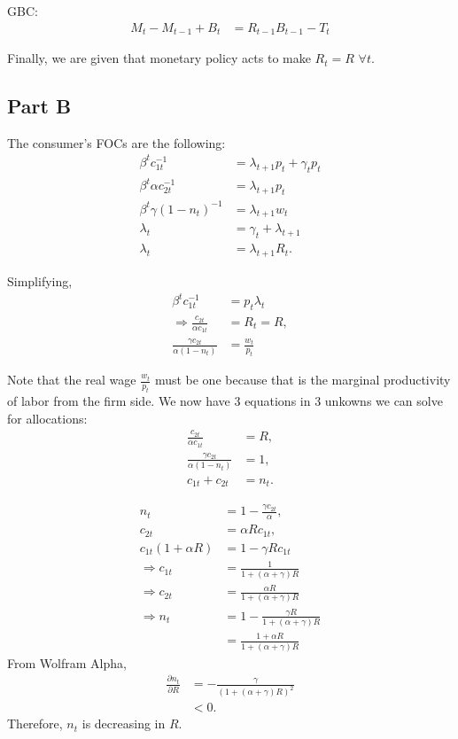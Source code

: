 \documentclass[11pt]{article} %
\begin{document}
GBC:
\begin{align*}
M_t - M_{t-1} + B_t &= R_{t-1}B_{t-1} - T_t
\end{align*}

Finally, we are given that monetary policy acts to make $R_t = R$ $\forall t.$
\subsection{Part B}
The consumer's FOCs are the following:
\begin{align*}
\beta^t c_{1t}^{-1} &= \lambda_{t+1} p_{t} + \gamma_t p_t\\
\beta^t \alpha c_{2t}^{-1} &= \lambda_{t+1}p_{t}\\
\beta^t \gamma (1-n_t)^{-1} &= \lambda_{t+1}w_t\\
\lambda_t &= \gamma_t + \lambda_{t+1} \\
\lambda_{t} &= \lambda_{t+1} R_{t}.
\end{align*}

Simplifying,
\begin{align*}
\beta^t c_{1t}^{-1} &= p_t\lambda_t\\
\Rightarrow \frac{c_{2t}}{\alpha c_{1t}} &= R_t = R, \\
\frac{\gamma c_{2t}}{\alpha(1-n_t)} &= \frac{w_t}{p_t}
\end{align*}

Note that the real wage $\frac{w_t}{p_t}$ must be one because that is the marginal productivity of labor from the firm side. We now have 3 equations in 3 unkowns we can solve for allocations:
\begin{align}
\frac{c_{2t}}{\alpha c_{1t}} &= R, \\
\frac{\gamma c_{2t}}{\alpha(1-n_t)} &= 1, \\
c_{1t} + c_{2t} &= n_t.
\end{align}

\begin{align*}
n_t &= 1 - \frac{\gamma c_{2t}}{\alpha},\\
c_{2t} &= \alpha Rc_{1t},\\
c_{1t}(1+\alpha R) &= 1 - \gamma  Rc_{1t} \\
\Rightarrow c_{1t} &= \frac{1}{1+(\alpha+\gamma) R} \\
\Rightarrow c_{2t} &= \frac{\alpha R}{1+(\alpha+\gamma) R} \\
\Rightarrow n_t &= 1 - \frac{\gamma R}{1+(\alpha+\gamma) R} \\
&= \frac{1+\alpha R}{1+(\alpha+\gamma) R}
\end{align*}
From Wolfram Alpha,
\begin{align*}
\frac{\partial n_t}{\partial R} &= - \frac{\gamma}{(1+(\alpha+\gamma)R)^2}\\
&<0.
\end{align*}
Therefore, $n_t$ is decreasing in $R$.
\end{document}
